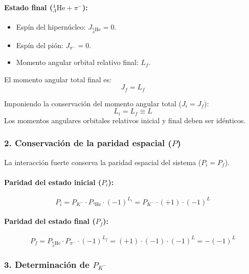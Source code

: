 \begin{problema}
\paragraph{Estado final (${}_\Lambda^4\text{He} + \pi^-$):}
\begin{itemize}
    \item Espín del hipernúcleo: $J_{{}_\Lambda^4\text{He}} = 0$.
    \item Espín del pión: $J_{\pi^-} = 0$.
    \item Momento angular orbital relativo final: $L_f$.
\end{itemize}
El momento angular total final es:
\begin{equation*}
J_f = L_f
\end{equation*}

Imponiendo la conservación del momento angular total ($J_i = J_f$):
\begin{equation*}
L_i = L_f \equiv L
\end{equation*}
Los momentos angulares orbitales relativos inicial y final deben ser idénticos.

\subsubsection*{2. Conservación de la paridad espacial ($P$)}

La interacción fuerte conserva la paridad espacial del sistema ($P_i = P_f$).

\paragraph{Paridad del estado inicial ($P_i$):}
\begin{equation*}
P_i = P_{K^-} \cdot P_{{}^4\text{He}} \cdot (-1)^{L_i} = P_{K^-} \cdot (+1) \cdot (-1)^L
\end{equation*}

\paragraph{Paridad del estado final ($P_f$):}
\begin{equation*}
P_f = P_{{}_\Lambda^4\text{He}} \cdot P_{\pi^-} \cdot (-1)^{L_f} = (+1) \cdot (-1) \cdot (-1)^L = -(-1)^L
\end{equation*}

\subsubsection*{3. Determinación de $P_{K^-}$}


\end{problema}
